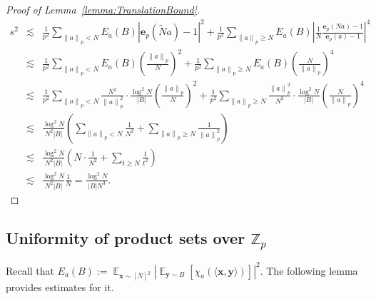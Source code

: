 \documentclass[11pt]{article}
\numberwithin{equation}{section}
\theoremstyle{definition}
\theoremstyle{plain}
\newcommand{\Z}{\mathbb Z}
\theoremstyle{definition}\newtheorem{problem}[theorem]{Problem}\theoremstyle{plain}
\DeclareMathOperator{\Ex}{{\mathbb E}}
\newcommand{\e}{\mathbf{e}}
\newcommand{\x}{\mathbf{x}}
\newcommand{\y}{\mathbf{y}}
\newcommand{\ip}[1]{\langle #1 \rangle}
\newcommand{\norm}[1]{\left\| #1 \right\|_p}
\begin{document}
\begin{proof}[Proof of Lemma~\ref{lemma:TranslationBound}]
\begin{eqnarray*}
	 s^2 & \lesssim &\frac{1}{p^2} \sum_{\norm{a} < N} E_a(B)  |\e_p(\tilde{N}a)-1|^2  + \frac{1}{p^2}\sum_{\norm{a} \ge N}    E_a(B)  \left|\frac{1}{N} \frac{\e_p(Na)-1}{\e_p(a)-1}\right|^4 \\
& \lesssim &\frac{1}{p^2} \sum_{\norm{a} < N}  E_a(B) \left(\frac{\norm{a}}{N} \right)^2  + \frac{1}{p^2}\sum_{\norm{a} \ge N}     E_a(B) \left(\frac{N}{\norm{a}} \right)^4  \\
&\lesssim& \frac{1}{p^2} \sum_{\norm{a} < N}  \frac{N^2}{\norm{a}^2} \cdot \frac{\log^2 N}{|B|}   \left(\frac{ \norm{a}}{N} \right)^2 +  \frac{1}{p^2} \sum_{\norm{a} \ge N}  \frac{\norm{a}^2}{N^2} \cdot \frac{\log^2 N}{|B|}  \left(\frac{N}{ \norm{a}} \right)^4   \\
	 &\lesssim&\frac{\log^2 N }{N^2|B|}  \left( \sum_{\norm{a} < N}  \frac{1}{N^2} +  \sum_{\norm{a} \ge N}   \frac{ 1}{\norm{a}^2} \right) \\
	 &\lesssim&\frac{\log^2 N }{N^2|B|}  \left( N \cdot  \frac{1}{N^2} +  \sum_{t \ge N}  \frac{1 }{t^2} \right) \\
&\lesssim & \frac{\log^2 N}{N^2|B|} \frac{1}{N} = \frac{ \log^2 N}{|B|N^3}.
\end{eqnarray*}
 \end{proof}

\subsection{Uniformity of product sets over $\Z_p$}
Recall that $ E_a(B) :=   \Ex_{\x \sim [N]^2}  \left|\Ex_{\y \sim B}   \left[ \chi_a(\ip{\x,\y})\right]\right|^2$. The following
lemma provides estimates for it.
\end{document}
